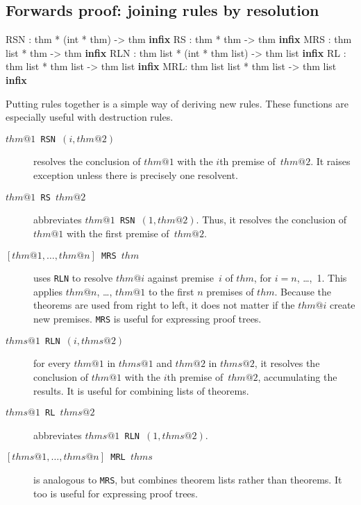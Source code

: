 \subsection{Forwards proof: joining rules by resolution}
\begin{ttbox} 
RSN : thm * (int * thm) -> thm                 \hfill{\bf infix}
RS  : thm * thm -> thm                         \hfill{\bf infix}
MRS : thm list * thm -> thm                    \hfill{\bf infix}
RLN : thm list * (int * thm list) -> thm list  \hfill{\bf infix}
RL  : thm list * thm list -> thm list          \hfill{\bf infix}
MRL: thm list list * thm list -> thm list      \hfill{\bf infix}
\end{ttbox}
Putting rules together is a simple way of deriving new rules.  These
functions are especially useful with destruction rules.
\begin{description}
\item[\tt$thm@1$ RSN $(i,thm@2)$]  
resolves the conclusion of $thm@1$ with the $i$th premise of~$thm@2$.  It
raises exception  unless there is precisely one resolvent.

\item[\tt$thm@1$ RS $thm@2$]  
abbreviates \hbox{\tt$thm@1$ RSN $(1,thm@2)$}.  Thus, it resolves the
conclusion of $thm@1$ with the first premise of~$thm@2$.

\item[\tt {$[thm@1,\ldots,thm@n]$} MRS $thm$]  
  uses {\tt RLN} to resolve $thm@i$ against premise~$i$ of $thm$, for
  $i=n$, \ldots,~1.  This applies $thm@n$, \ldots, $thm@1$ to the first $n$
  premises of $thm$.  Because the theorems are used from right to left, it
  does not matter if the $thm@i$ create new premises.  {\tt MRS} is useful
  for expressing proof trees.

\item[\tt$thms@1$ RLN $(i,thms@2)$]  
for every $thm@1$ in $thms@1$ and $thm@2$ in $thms@2$, it resolves the
conclusion of $thm@1$ with the $i$th premise of~$thm@2$, accumulating the
results.  It is useful for combining lists of theorems.

\item[\tt$thms@1$ RL $thms@2$]  
abbreviates \hbox{\tt$thms@1$ RLN $(1,thms@2)$}. 

\item[\tt {$[thms@1,\ldots,thms@n]$} MRL $thms$]  
is analogous to {\tt MRS}, but combines theorem lists rather than theorems.
It too is useful for expressing proof trees.
\end{description}


